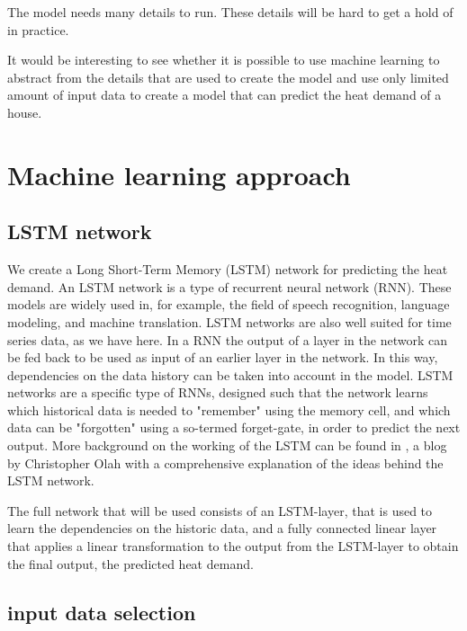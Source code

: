 The model needs many details to run. These details will be hard to get a hold of in practice.

It would be interesting to see whether it is possible to use machine learning to abstract from the details that are used to create the model and use only limited amount of input data to create a model that can predict the heat demand of a house. 

 




\section{Machine learning approach}\label{s:MLA}


\subsection{LSTM network}
We create a Long Short-Term Memory (LSTM) network for predicting the heat demand. An LSTM network is a type of recurrent neural network (RNN). These models are widely used in, for example, the field of speech recognition, language modeling, and machine translation. LSTM networks are also well suited for time series data, as we have here. In a RNN the output of a layer in the network can be fed back to be used as input of an earlier layer in the network. In this way, dependencies on the data history can be taken into account in the model. LSTM networks are a specific type of RNNs, designed such that the network learns which historical data is needed to 
"remember" using the memory cell, and which data can be "forgotten" using a so-termed forget-gate, in order to predict the next output. More background on the working of the LSTM can be found in \cite{LSTM}, a blog by Christopher Olah with a comprehensive explanation of the ideas behind the LSTM network. 

The full network that will be used consists of an LSTM-layer, that is used to learn the dependencies on the historic data, and a fully connected linear layer that applies a linear transformation to the output from the LSTM-layer to obtain the final output, the predicted heat demand. 



\subsection{input data selection}

